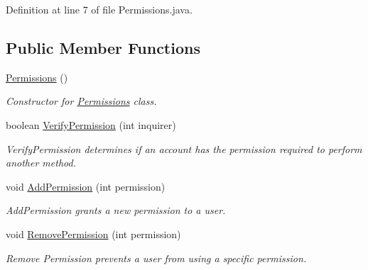 Definition at line 7 of file Permissions.java.\subsection*{Public Member Functions}
\begin{CompactItemize}
\item 
\hyperlink{classPermissions_b4c550a272e6a05c4d883583bd95dd11}{Permissions} ()
\begin{CompactList}\small\item\em Constructor for \hyperlink{classPermissions}{Permissions} class. \item\end{CompactList}\item 
boolean \hyperlink{classPermissions_e696edf1ce33ee98e5c066be8a243f5f}{VerifyPermission} (int inquirer)
\begin{CompactList}\small\item\em VerifyPermission determines if an account has the permission required to perform another method. \item\end{CompactList}\item 
void \hyperlink{classPermissions_8a87919d26aa22c5c5d91cf6e92dba9d}{AddPermission} (int permission)
\begin{CompactList}\small\item\em AddPermission grants a new permission to a user. \item\end{CompactList}\item 
void \hyperlink{classPermissions_59b642c9487b1941f2977c830b18ee71}{RemovePermission} (int permission)
\begin{CompactList}\small\item\em Remove Permission prevents a user from using a specific permission. \item\end{CompactList}\end{CompactItemize}

